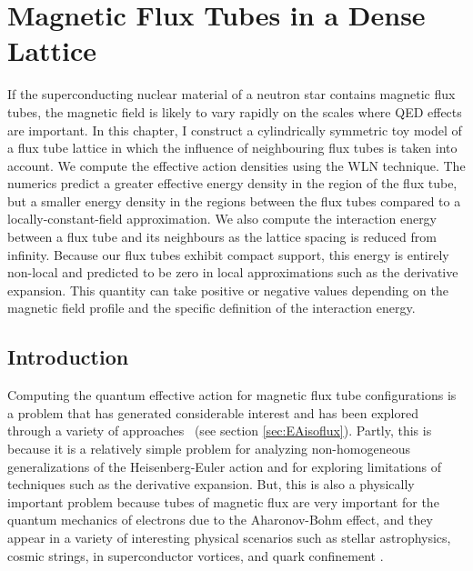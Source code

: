 \chapter{Magnetic Flux Tubes in a Dense Lattice}
\label{ch:periodic}
\acresetall

\begin{summary}
If the superconducting nuclear material of a neutron star contains magnetic flux tubes, 
the magnetic field is likely to vary rapidly on the scales where \acs{QED} effects 
are important.
In this chapter, I construct a cylindrically symmetric toy model of a flux 
tube lattice in which the influence of neighbouring flux tubes is taken into account.
We compute the effective action densities using the \acs{WLN} technique.
The numerics predict a greater effective energy density in the 
region of the flux tube, but a smaller energy density in the regions 
between the flux tubes compared to a locally-constant-field approximation. 
We also compute the interaction energy between a flux tube and its neighbours 
as the lattice spacing is reduced from infinity. Because our flux tubes 
exhibit compact support, this energy is entirely non-local and
predicted to be zero in local approximations
such as the derivative expansion. This quantity can take 
positive or negative values depending on the magnetic field profile and the 
specific definition of the interaction energy. 
\end{summary}

\section{Introduction}


Computing the quantum effective action for magnetic flux tube 
configurations is a problem that has generated considerable interest
and has been explored through a variety of approaches~\cite{Gornicki1990271, 
1998MPLA...13..379S, 0264-9381-12-5-013, PhysRevD.51.810, 1999PhRvD..60j5019B,
PhysRevD.62.085024, 2001PhRvD..64j5011P, 2003PhRvD..68f5026B, 
2005NuPhB.707..233G, 2006JPhA...39.6799W, Weigel:2010pf, Langfeld:2002vy}
(see section \ref{sec:EAisoflux}). 
Partly, this 
is because it is a relatively simple problem for analyzing non-homogeneous 
generalizations of the Heisenberg-Euler action and for exploring 
limitations of techniques such as the derivative expansion. But, this 
is also a physically important problem because tubes of magnetic flux 
are very important for the quantum mechanics of electrons due 
to the Aharonov-Bohm effect, and they appear 
in a variety of interesting physical scenarios such as stellar astrophysics, 
cosmic strings, in superconductor vortices, and quark confinement
\cite{2003PrPNP..51....1G}.

